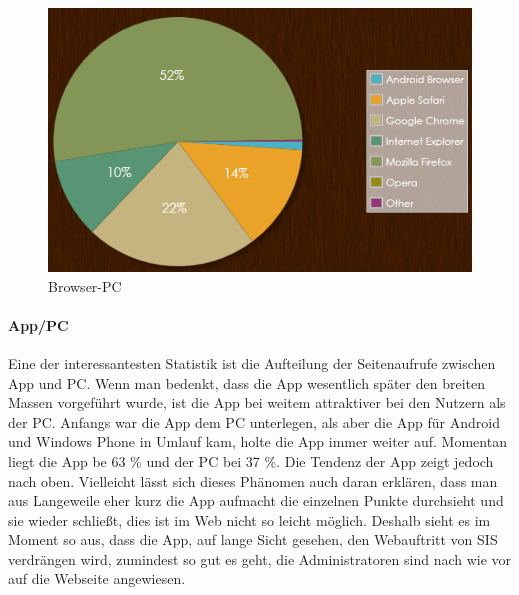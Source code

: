 \begin{figure}[H]
\centering
\includegraphics[keepaspectratio=true, width=12cm]{images/screenshots/statistics/pc_browser.png}
\caption{Browser-PC}
\label{fig:content_draft_log_pc_browser}
\end{figure}

\paragraph{App/PC\\}
Eine der interessantesten Statistik ist die Aufteilung der Seitenaufrufe zwischen App und PC. Wenn man bedenkt, dass die App wesentlich später den breiten Massen vorgeführt wurde, ist die App bei weitem attraktiver bei den Nutzern als der PC. Anfangs war die App dem PC unterlegen, als aber die App für Android und Windows Phone in Umlauf kam, holte die App immer weiter auf. Momentan liegt die App be 63 \% und der PC bei 37 \%. Die Tendenz der App zeigt jedoch nach oben. Vielleicht lässt sich dieses Phänomen auch daran erklären, dass man aus Langeweile eher kurz die App aufmacht die einzelnen Punkte durchsieht und sie wieder schließt, dies ist im Web nicht so leicht möglich. Deshalb sieht es im Moment so aus, dass die App, auf lange Sicht gesehen, den Webauftritt von SIS verdrängen wird, zumindest so gut es geht, die Administratoren sind nach wie vor auf die Webseite angewiesen.

